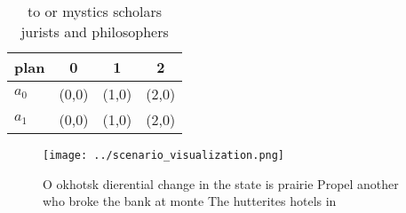 \documentclass[a4paper]{article}
\begin{document}
\begin{table}
\begin{adjustbox}{width=0.6\columnwidth}
\begin{tabular}{|l|l|l|l|}
\hline
\textbf{plan} & \multicolumn{1}{c|}{\textbf{0}} & \multicolumn{1}{c|}{\textbf{1}} & \multicolumn{1}{c|}{\textbf{2}} \\ \hline
\textbf{$a_0$}  & (0,0) & (1,0) & (2,0) \\ \hline
\textbf{$a_1$}  & (0,0) & (1,0) & (2,0) \\ \hline
\end{tabular}
\end{adjustbox}
\caption{ to or mystics scholars jurists and philosophers 
}
\end{table}

\begin{figure}
\centering
\texttt{[image: ../scenario\_visualization.png]}
\caption{O okhotsk dierential change in the state is prairie Propel another who broke the bank at monte The hutterites hotels in
}
\end{figure}
 
\end{document}
